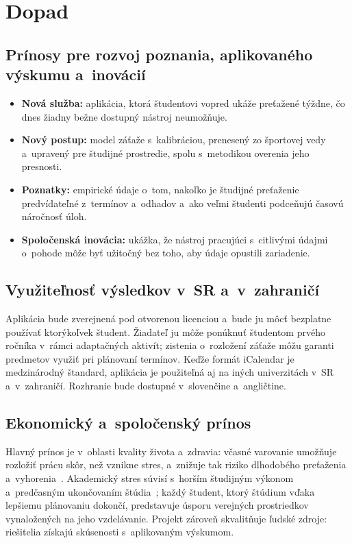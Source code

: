 \documentclass[11pt,a4paper]{article}
\begin{document}
\section{Dopad}

\subsection{Prínosy pre rozvoj poznania, aplikovaného výskumu a~inovácií}

\begin{itemize}[nosep]
  \item \textbf{Nová služba:} aplikácia, ktorá študentovi vopred ukáže
    preťažené týždne, čo dnes žiadny bežne dostupný nástroj neumožňuje.
  \item \textbf{Nový postup:} model záťaže s~kalibráciou, prenesený zo
    športovej vedy a~upravený pre študijné prostredie, spolu s~metodikou
    overenia jeho presnosti.
  \item \textbf{Poznatky:} empirické údaje o~tom, nakoľko je študijné
    preťaženie predvídateľné z~termínov a~odhadov a~ako veľmi študenti
    podceňujú časovú náročnosť úloh.
  \item \textbf{Spoločenská inovácia:} ukážka, že nástroj pracujúci
    s~citlivými údajmi o~pohode môže byť užitočný bez toho, aby údaje
    opustili zariadenie.
\end{itemize}

\subsection{Využiteľnosť výsledkov v~SR a~v~zahraničí}

Aplikácia bude zverejnená pod otvorenou licenciou a~bude ju môcť bezplatne
používať ktorýkoľvek študent. Žiadateľ ju môže ponúknuť študentom prvého
ročníka v~rámci adaptačných aktivít; zistenia o~rozložení záťaže môžu
garanti predmetov využiť pri plánovaní termínov. Keďže formát iCalendar
je medzinárodný štandard, aplikácia je použiteľná aj na iných
univerzitách v~SR a~v~zahraničí. Rozhranie bude dostupné v~slovenčine
a~angličtine.

\subsection{Ekonomický a~spoločenský prínos}

Hlavný prínos je v~oblasti kvality života a~zdravia: včasné varovanie
umožňuje rozložiť prácu skôr, než vznikne stres, a~znižuje tak riziko
dlhodobého preťaženia a~vyhorenia~\cite{Maslach:Burnout}. Akademický
stres súvisí s~horším študijným výkonom a~predčasným ukončovaním
štúdia~\cite{Pascoe:Stress}; každý študent, ktorý štúdium vďaka lepšiemu
plánovaniu dokončí, predstavuje úsporu verejných prostriedkov vynaložených
na jeho vzdelávanie. Projekt zároveň skvalitňuje ľudské zdroje: riešitelia
získajú skúsenosti s~aplikovaným výskumom.
\end{document}
